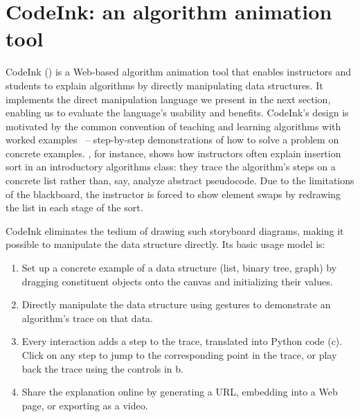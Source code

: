 \section{CodeInk: an algorithm animation tool}




CodeInk () is a Web-based algorithm animation tool that
enables instructors and students to explain algorithms by directly manipulating
data structures. It implements the direct manipulation language we present in the
next section, enabling us to evaluate the language's usability and benefits.
CodeInk's design is motivated by the common convention of teaching and learning
algorithms with worked examples~\cite{Sweller1985} -- step-by-step
demonstrations of how to solve a problem on concrete examples.
, for instance, shows how instructors often explain
insertion sort in an introductory algorithms class: they trace the algorithm's
steps on a concrete list rather than, say, analyze abstract pseudocode.
Due to the limitations of the blackboard, the instructor is forced to show
element swaps by redrawing the list in each stage of the sort.

CodeInk eliminates the tedium of drawing such storyboard diagrams, making it possible to
manipulate the data structure directly. Its basic usage model is:

\begin{enumerate}

\item Set up a concrete example of a data structure (list, binary tree,
graph) by dragging constituent objects onto the canvas and
initializing their values.

\item Directly manipulate the data structure using gestures to
demonstrate an algorithm's trace on that data.

\item Every interaction adds a step to the trace, translated into Python
code (c). Click on any step to jump to the
corresponding point in the trace, or play back the trace using the
controls in b.

\item Share the explanation online by generating a URL, embedding into a
Web page, or exporting as a video.

\end{enumerate}

